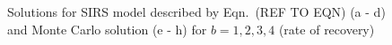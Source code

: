 \documentclass[10pt,showpacs,preprintnumbers,amsmath,amssymb,nofootinbib,aps,prl,twocolumn,groupedaddress,superscriptaddress,showkeys]{revtex4-1}
\begin{document}
\begin{figure}[h!tb]
  \caption{\label{fig:prob_ab}Solutions for SIRS model described by Eqn.~(REF TO EQN) (a - d) and Monte Carlo solution (e - h) for $b=1, 2, 3, 4$ (rate of recovery)}
\end{figure}
\end{document}
